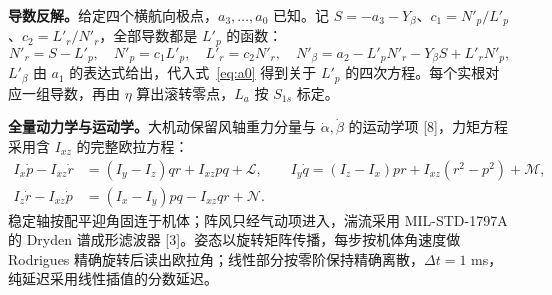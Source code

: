 \documentclass[UTF8,a4paper,11pt,fontset=fandol,scheme=plain]{ctexart}
\begin{document}
\textbf{导数反解。}给定四个横航向极点，\(a_3,\dots,a_0\) 已知。记 \(S=-a_3-Y_\beta\)、\(c_1=N'_p/L'_p\)、\(c_2=L'_r/N'_r\)，全部导数都是 \(L'_p\) 的函数：
\begin{equation}
N'_r=S-L'_p,\quad N'_p=c_1L'_p,\quad L'_r=c_2N'_r,\quad N'_\beta=a_2-L'_pN'_r-Y_\beta S+L'_rN'_p,
\end{equation}
\(L'_\beta\) 由 \(a_1\) 的表达式给出，代入式~\eqref{eq:a0} 得到关于 \(L'_p\) 的四次方程。每个实根对应一组导数，再由 \(\eta\) 算出滚转零点，\(L_a\) 按 \(S_{1s}\) 标定。

\textbf{全量动力学与运动学。}大机动保留风轴重力分量与 \(\dot\alpha,\dot\beta\) 的运动学项 [8]，力矩方程采用含 \(I_{xz}\) 的完整欧拉方程：
\begin{equation}
\begin{aligned}
I_x\dot p-I_{xz}\dot r&=(I_y-I_z)qr+I_{xz}pq+\mathcal L,\qquad I_y\dot q=(I_z-I_x)pr+I_{xz}(r^2-p^2)+\mathcal M,\\
I_z\dot r-I_{xz}\dot p&=(I_x-I_y)pq-I_{xz}qr+\mathcal N .
\end{aligned}
\end{equation}
稳定轴按配平迎角固连于机体；阵风只经气动项进入，湍流采用 MIL-STD-1797A 的 Dryden 谱成形滤波器 [3]。姿态以旋转矩阵传播，每步按机体角速度做 Rodrigues 精确旋转后读出欧拉角；线性部分按零阶保持精确离散，\(\Delta t=1\) ms，纯延迟采用线性插值的分数延迟。
\end{document}
